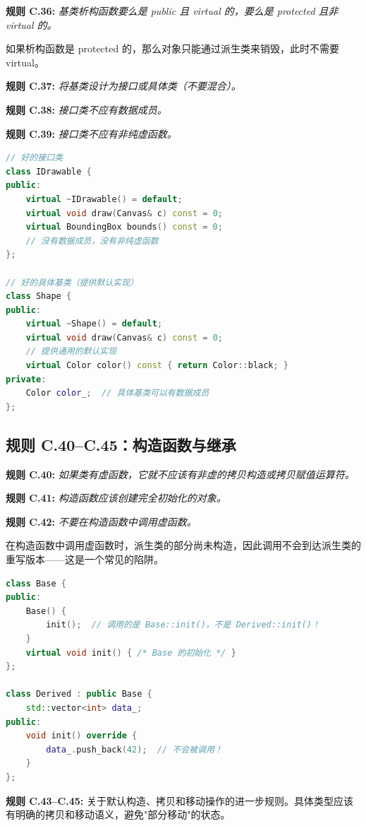 \textbf{规则 C.36:} \textit{基类析构函数要么是 public 且 virtual 的，要么是 protected 且非 virtual 的。}

如果析构函数是 protected 的，那么对象只能通过派生类来销毁，此时不需要 virtual。

\textbf{规则 C.37:} \textit{将基类设计为接口或具体类（不要混合）。}

\textbf{规则 C.38:} \textit{接口类不应有数据成员。}

\textbf{规则 C.39:} \textit{接口类不应有非纯虚函数。}

\begin{lstlisting}[language=C++]
// 好的接口类
class IDrawable {
public:
    virtual ~IDrawable() = default;
    virtual void draw(Canvas& c) const = 0;
    virtual BoundingBox bounds() const = 0;
    // 没有数据成员，没有非纯虚函数
};

// 好的具体基类（提供默认实现）
class Shape {
public:
    virtual ~Shape() = default;
    virtual void draw(Canvas& c) const = 0;
    // 提供通用的默认实现
    virtual Color color() const { return Color::black; }
private:
    Color color_;  // 具体基类可以有数据成员
};
\end{lstlisting}

\subsection{规则 C.40--C.45：构造函数与继承}

\textbf{规则 C.40:} \textit{如果类有虚函数，它就不应该有非虚的拷贝构造或拷贝赋值运算符。}

\textbf{规则 C.41:} \textit{构造函数应该创建完全初始化的对象。}

\textbf{规则 C.42:} \textit{不要在构造函数中调用虚函数。}

在构造函数中调用虚函数时，派生类的部分尚未构造，因此调用不会到达派生类的重写版本——这是一个常见的陷阱。

\begin{lstlisting}[language=C++]
class Base {
public:
    Base() {
        init();  // 调用的是 Base::init()，不是 Derived::init()！
    }
    virtual void init() { /* Base 的初始化 */ }
};

class Derived : public Base {
    std::vector<int> data_;
public:
    void init() override {
        data_.push_back(42);  // 不会被调用！
    }
};
\end{lstlisting}

\textbf{规则 C.43--C.45:} 关于默认构造、拷贝和移动操作的进一步规则。具体类型应该有明确的拷贝和移动语义，避免"部分移动"的状态。

